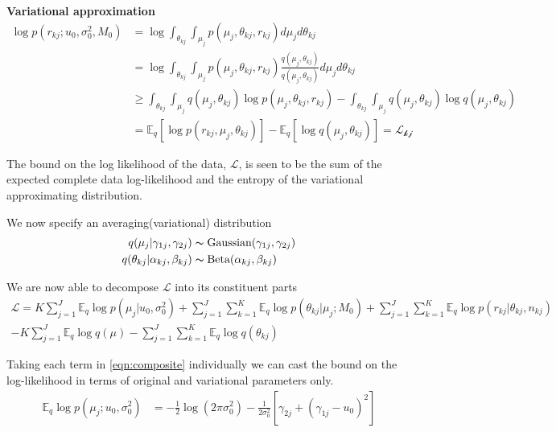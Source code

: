 \documentclass[10pt, letterpaper]{article}
\newcommand{\E}{\mathbb{E}}
\begin{document}
{\bf Variational approximation}
\begin{align}
\log p(r_{kj}; u_0, \sigma_0^2, M_0) & = \log \int_{\theta_{kj}} \int_{\mu_j} p(\mu_j, \theta_{kj}, r_{kj})d\mu_jd\theta_{kj} \\
& = \log \int_{\theta_{kj}} \int_{\mu_j} p(\mu_j, \theta_{kj}, r_{kj}) \frac{q(\mu_j, \theta_{kj})}{q(\mu_j, \theta_{kj})}  d\mu_jd\theta_{kj}\\
& \geq  \int_{\theta_{kj}} \int_{\mu_j} q(\mu_j, \theta_{kj}) \log p(\mu_j, \theta_{kj}, r_{kj}) -  \int_{\theta_{kj}} \int_{\mu_j} q(\mu_j, \theta_{kj}) \log q(\mu_j, \theta_{kj}) \\
& = \E_q \left[ \log p(r_{kj}, \mu_j, \theta_{kj}) \right] - \E_q\left[ \log q(\mu_j, \theta_{kj}) \right] = \mathcal{L_{kj}}
\end{align}

The bound on the log likelihood of the data, $\mathcal{L}$, is seen to be the sum of the expected complete data log-likelihood and the entropy of the variational approximating distribution.

We now specify an averaging(variational) distribution
\begin{align}
q(\mu_j | \gamma_{1j}, \gamma_{2j}) & \thicksim \text{Gaussian}(\gamma_{1j}, \gamma_{2j})\\
q(\theta_{kj} | \alpha_{kj}, \beta_{kj} ) & \thicksim \text{Beta}(\alpha_{kj}, \beta_{kj})
\end{align}

We are now able to decompose $\mathcal{L}$ into its constituent parts
\begin{multline}\label{eqn:composite}
\mathcal{L} = K\sum_{j=1}^J \E_q\log p(\mu_j|u_0,\sigma_0^2) + \sum_{j=1}^J\sum_{k=1}^K\E_q \log p(\theta_{kj} | \mu_j; M_0) 
+ \sum_{j=1}^J\sum_{k=1}^K\E_q \log p(r_{kj} | \theta_{kj}, n_{kj})\\
- K\sum_{j=1}^J\E_q \log q(\mu) - \sum_{j=1}^J\sum_{k=1}^K \E_q \log q(\theta_{kj})
\end{multline}

Taking each term in \eqref{eqn:composite} individually we can cast the bound on the log-likelihood in terms of original and variational parameters only.
\begin{align}
\E_q \log p(\mu_j ; u_0, \sigma_0^2) & = -\frac{1}{2}\log (2\pi\sigma_0^2) -\frac{1}{2\sigma_0^2}\left[ \gamma_{2j} + (\gamma_{1j} - u_0)^2 \right]
\end{align}
\end{document}
